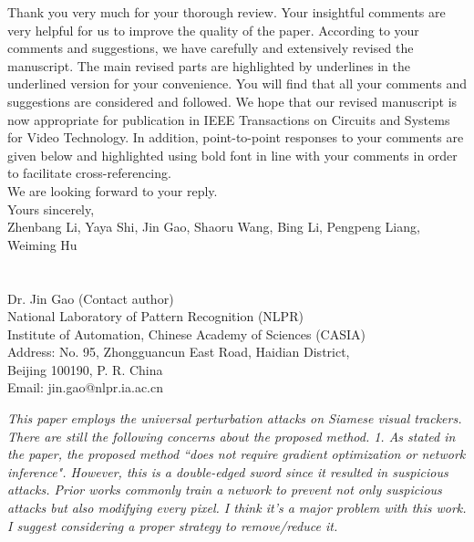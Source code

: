 \documentclass[12pt]{article}
\begin{document}
Thank you very much for your thorough review. Your insightful comments are very helpful for us to improve the quality of the paper. According to your comments and suggestions, we have carefully and extensively revised the manuscript. The main revised parts are highlighted by underlines in the underlined version for your convenience. You will find that all your comments and suggestions are considered and followed. We hope that our revised manuscript is now appropriate for publication in IEEE Transactions on Circuits and Systems for Video Technology.
In addition, point-to-point responses to your comments are given below and highlighted using bold font in line with your comments in order to facilitate cross-referencing.\\[10pt]
\indent We are looking forward to your reply.\\[10pt]
\noindent Yours sincerely,\\
\noindent Zhenbang Li, Yaya Shi, Jin Gao, Shaoru Wang, Bing Li, Pengpeng Liang, Weiming Hu
\\
\\
\\
\noindent Dr. Jin Gao (Contact author)\\
\noindent National Laboratory of Pattern Recognition (NLPR)\\
\noindent Institute of Automation, Chinese Academy of Sciences (CASIA)\\
\noindent Address: No. 95, Zhongguancun East Road, Haidian District,\\
\noindent Beijing 100190, P. R. China\\
\noindent Email: jin.gao@nlpr.ia.ac.cn

\newpage

\textit{This paper employs the universal perturbation attacks on Siamese visual trackers. There are still the following concerns about the proposed method. 1. As stated in the paper, the proposed method ``does not require gradient optimization or network inference". However, this is a double-edged sword since it resulted in suspicious attacks. Prior works commonly train a network to prevent not only suspicious attacks but also modifying every pixel. I think it's a major problem with this work. I suggest considering a proper strategy to remove/reduce it.}
\end{document}
